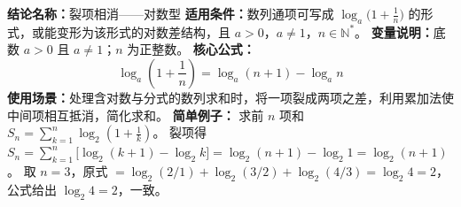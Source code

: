 \textbf{结论名称：}裂项相消——对数型
\textbf{适用条件：}数列通项可写成 \(\log_a\!\bigl(1+\frac{1}{n}\bigr)\) 的形式，或能变形为该形式的对数差结构，且 \(a>0\)，\(a\neq1\)，\(n\in\mathbb{N}^*\)。
\textbf{变量说明：}底数 \(a>0\) 且 \(a\neq1\)；\(n\) 为正整数。
\textbf{核心公式：}
\[
   \boxed{\log_a\!\left(1+\frac{1}{n}\right)=\log_a(n+1)-\log_a n}
\]
\textbf{使用场景：}处理含对数与分式的数列求和时，将一项裂成两项之差，利用累加法使中间项相互抵消，简化求和。
\textbf{简单例子：}
求前 \(n\) 项和 \(S_n=\displaystyle\sum_{k=1}^{n}\log_2\!\left(1+\frac{1}{k}\right)\)。
裂项得 \(S_n=\sum_{k=1}^{n}\bigl[\log_2(k+1)-\log_2 k\bigr]=\log_2(n+1)-\log_2 1=\log_2(n+1)\)。
取 \(n=3\)，原式 \(=\log_2(2/1)+\log_2(3/2)+\log_2(4/3)=\log_2 4=2\)，公式给出 \(\log_2 4=2\)，一致。